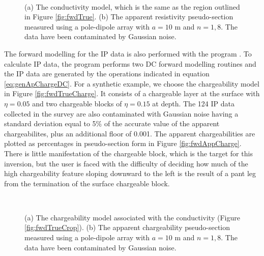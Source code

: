 %
\begin{figure}
\centering
{} \\ 
\caption{(a) The conductivity model, which is the same as the region outlined in Figure \ref{fig:fwdTrue}. (b) The apparent resistivity pseudo-section measured using a pole-dipole array with $a=10$ m and $n=1,8$. The data have been contaminated by Gaussian noise.}
\end{figure}

The forward modelling for the IP data is also performed with the program . To calculate IP data, the program performs two DC forward modelling routines and the IP data are generated by the operations indicated in equation \ref{eq:genApChargeDC}. For a synthetic example, we choose the chargeability model in Figure \ref{fig:fwdTrueCharge}. It consists of a chargeable layer at the surface with  $\eta = 0.05$ and two chargeable blocks of $\eta = 0.15$ at depth. The 124 IP data collected in the survey are also contaminated with Gaussian noise having a standard deviation equal to 5\% of the accurate value of the apparent chargeabilites, plus an additional floor of 0.001. The apparent chargeabilities are plotted as percentages in pseudo-section form in Figure \ref{fig:fwdAppCharge}. There is little manifestation of the chargeable block, which is the target for this inversion, but the user is faced with the difficulty of deciding how much of the high chargeability feature sloping downward to the left is the result of a pant leg from the termination of the surface chargeable block. 

\begin{figure}
\centering
{} \\ 
\caption{(a) The chargeability model associated with the conductivity (Figure \ref{fig:fwdTrueCrop}). (b) The apparent chargeability pseudo-section measured using a pole-dipole array with $a=10$ m and $n=1,8$. The data have been contaminated by Gaussian noise.}
\end{figure}
%
